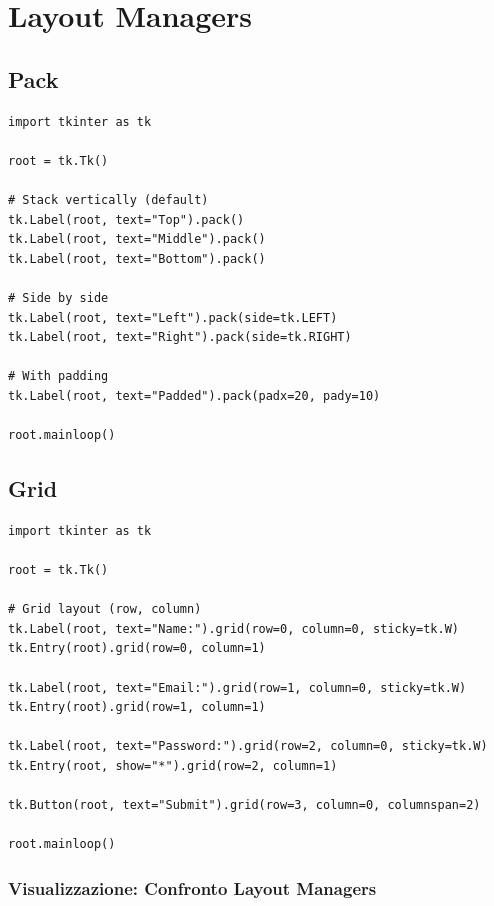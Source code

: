 \section{Layout Managers}

\subsection{Pack}

\begin{lstlisting}
import tkinter as tk

root = tk.Tk()

# Stack vertically (default)
tk.Label(root, text="Top").pack()
tk.Label(root, text="Middle").pack()
tk.Label(root, text="Bottom").pack()

# Side by side
tk.Label(root, text="Left").pack(side=tk.LEFT)
tk.Label(root, text="Right").pack(side=tk.RIGHT)

# With padding
tk.Label(root, text="Padded").pack(padx=20, pady=10)

root.mainloop()
\end{lstlisting}

\subsection{Grid}

\begin{lstlisting}
import tkinter as tk

root = tk.Tk()

# Grid layout (row, column)
tk.Label(root, text="Name:").grid(row=0, column=0, sticky=tk.W)
tk.Entry(root).grid(row=0, column=1)

tk.Label(root, text="Email:").grid(row=1, column=0, sticky=tk.W)
tk.Entry(root).grid(row=1, column=1)

tk.Label(root, text="Password:").grid(row=2, column=0, sticky=tk.W)
tk.Entry(root, show="*").grid(row=2, column=1)

tk.Button(root, text="Submit").grid(row=3, column=0, columnspan=2)

root.mainloop()
\end{lstlisting}

\subsubsection{Visualizzazione: Confronto Layout Managers}

